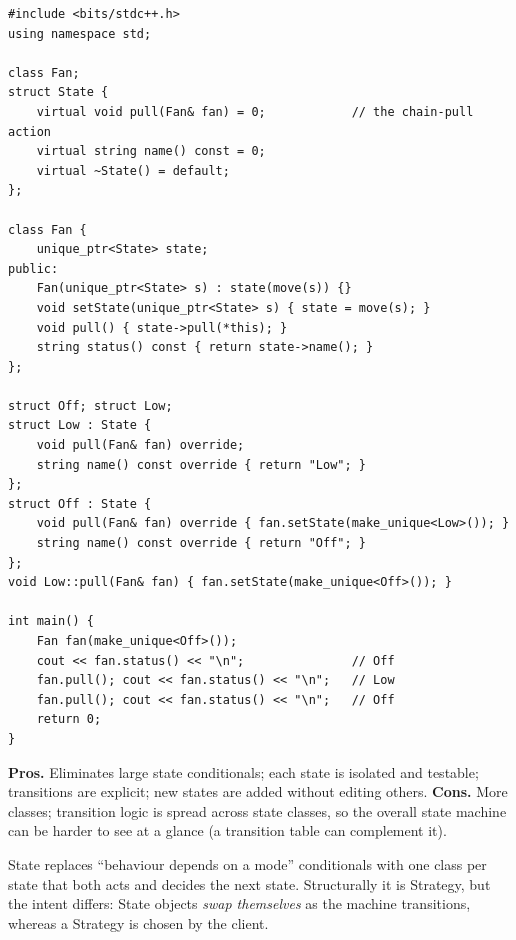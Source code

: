 \begin{lstlisting}
#include <bits/stdc++.h>
using namespace std;

class Fan;
struct State {
    virtual void pull(Fan& fan) = 0;            // the chain-pull action
    virtual string name() const = 0;
    virtual ~State() = default;
};

class Fan {
    unique_ptr<State> state;
public:
    Fan(unique_ptr<State> s) : state(move(s)) {}
    void setState(unique_ptr<State> s) { state = move(s); }
    void pull() { state->pull(*this); }
    string status() const { return state->name(); }
};

struct Off; struct Low;
struct Low : State {
    void pull(Fan& fan) override;
    string name() const override { return "Low"; }
};
struct Off : State {
    void pull(Fan& fan) override { fan.setState(make_unique<Low>()); }
    string name() const override { return "Off"; }
};
void Low::pull(Fan& fan) { fan.setState(make_unique<Off>()); }

int main() {
    Fan fan(make_unique<Off>());
    cout << fan.status() << "\n";               // Off
    fan.pull(); cout << fan.status() << "\n";   // Low
    fan.pull(); cout << fan.status() << "\n";   // Off
    return 0;
}
\end{lstlisting}

\begin{complexitybox}
\textbf{Pros.} Eliminates large state conditionals; each state is
isolated and testable; transitions are explicit; new states are added
without editing others. \textbf{Cons.} More classes; transition logic is
spread across state classes, so the overall state machine can be harder to
see at a glance (a transition table can complement it).
\end{complexitybox}

\begin{takeawaybox}
State replaces ``behaviour depends on a mode'' conditionals with one class
per state that both acts and decides the next state. Structurally it is
Strategy, but the intent differs: State objects \emph{swap themselves} as
the machine transitions, whereas a Strategy is chosen by the client.
\end{takeawaybox}
